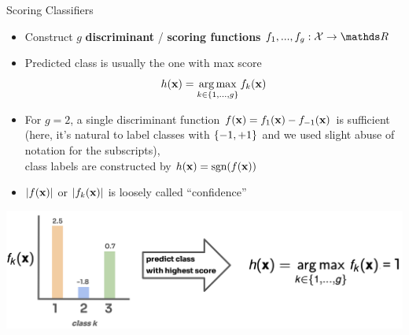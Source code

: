 \documentclass[11pt,compress,t,notes=noshow, xcolor=table]{beamer}
\begin{document}
\begin{vbframe}{Scoring Classifiers}
\begin{itemize}
\item Construct $g$ \textbf{discriminant} / \textbf{scoring functions} $f_1, ..., f_g: \Xspace \to \R$
\item Predicted class is usually the one with max score 
$$
h(\xv) = \argmax_{k \in \gset} \fkx[k]
$$ 

\item For $g = 2$, a single discriminant function $\fx = f_{1}(\xv) - f_{-1}(\xv)$ is sufficient (here, it's natural to label classes with $\setmp$ and we used slight abuse of notation for the subscripts), \\
class labels are constructed by $\hx = \text{sgn}(\fx)$
\item $|\fx|$ or $|\fkx|$ is loosely called \enquote{confidence}
\end{itemize}

\vspace{-0.3cm}

\begin{center}
  \includegraphics{figure_man/scores.png} 
\end{center}
 
\end{vbframe}
\end{document}
